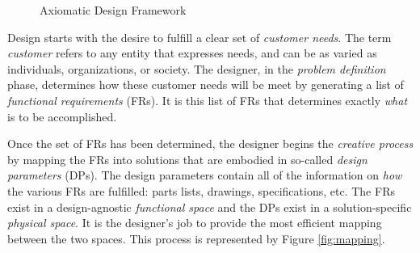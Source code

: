 \begin{figure}[h]
  \label{fig:design}
  \begin{center}
  \end{center}
  \caption{Axiomatic Design Framework}
\end{figure}

Design starts with the desire to fulfill a clear set of \emph{customer needs}.  The term \emph{customer} refers to
any entity that expresses needs, and can be as varied as individuals, organizations, or society.  The designer, in
the \emph{problem definition} phase, determines how these customer needs will be meet by generating a list of
\emph{functional requirements} (FRs).  It is this list of FRs that determines exactly \emph{what} is to be
accomplished.

Once the set of FRs has been determined, the designer begins the \emph{creative process} by mapping the FRs into
solutions that are embodied in so-called \emph{design parameters} (DPs).  The design parameters contain all of the
information on \emph{how} the various FRs are fulfilled: parts lists, drawings, specifications, etc.  The FRs exist
in a design-agnostic \emph{functional space} and the DPs exist in a solution-specific \emph{physical space}.  It is
the designer's job to provide the most efficient mapping between the two spaces.  This process is represented by
Figure \ref{fig:mapping}.

